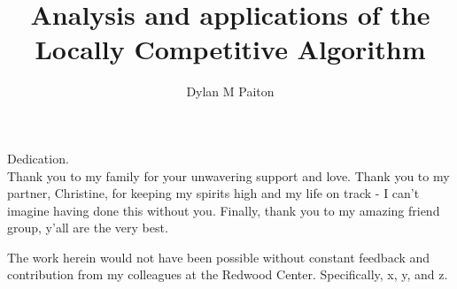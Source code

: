\documentclass{ucbthesis}
\begin{document}

\title{Analysis and applications of the Locally Competitive Algorithm}
\author{Dylan M Paiton}


\maketitle
\approvalpage
\copyrightpage



\begin{frontmatter}

\begin{dedication}
\null\vfil
\begin{center}
Dedication.\\\vspace{12pt}
Thank you to my family for your unwavering support and love. Thank you to my partner, Christine, for keeping my spirits high and my life on track - I can't imagine having done this without you. Finally, thank you to my amazing friend group, y'all are the very best.
\end{center}
\vfil\null
\end{dedication}


\tableofcontents
\clearpage
\listoffigures
\clearpage
\listoftables

\begin{acknowledgements}
The work herein would not have been possible without constant feedback and contribution from my colleagues at the Redwood Center. Specifically, x, y, and z.
\end{acknowledgements}

\end{frontmatter}
\end{document}
